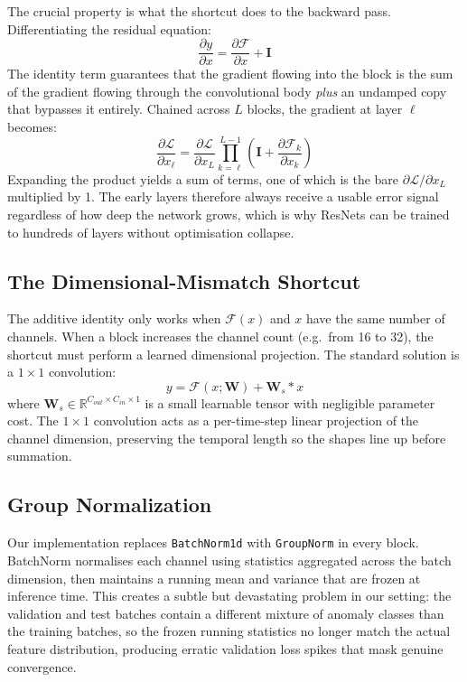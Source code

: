 The crucial property is what the shortcut does to the backward pass. Differentiating the residual equation:
\begin{equation}
    \frac{\partial y}{\partial x} = \frac{\partial \mathcal{F}}{\partial x} + \mathbf{I}
\end{equation}
The identity term guarantees that the gradient flowing into the block is the sum of the gradient flowing through the convolutional body \textit{plus} an undamped copy that bypasses it entirely. Chained across $L$ blocks, the gradient at layer $\ell$ becomes:
\begin{equation}
    \frac{\partial \mathcal{L}}{\partial x_{\ell}} = \frac{\partial \mathcal{L}}{\partial x_{L}} \prod_{k=\ell}^{L-1} \left( \mathbf{I} + \frac{\partial \mathcal{F}_{k}}{\partial x_{k}} \right)
\end{equation}
Expanding the product yields a sum of terms, one of which is the bare $\partial \mathcal{L}/\partial x_{L}$ multiplied by 1. The early layers therefore always receive a usable error signal regardless of how deep the network grows, which is why ResNets can be trained to hundreds of layers without optimisation collapse.

\subsection{The Dimensional-Mismatch Shortcut}
The additive identity only works when $\mathcal{F}(x)$ and $x$ have the same number of channels. When a block increases the channel count (e.g.\ from 16 to 32), the shortcut must perform a learned dimensional projection. The standard solution is a $1 \times 1$ convolution:
\begin{equation}
    y = \mathcal{F}(x; \mathbf{W}) + \mathbf{W}_{s} \ast x
\end{equation}
where $\mathbf{W}_{s} \in \mathbb{R}^{C_{out} \times C_{in} \times 1}$ is a small learnable tensor with negligible parameter cost. The $1 \times 1$ convolution acts as a per-time-step linear projection of the channel dimension, preserving the temporal length so the shapes line up before summation.

\subsection{Group Normalization}
Our implementation replaces \texttt{BatchNorm1d} with \texttt{GroupNorm} in every block. BatchNorm normalises each channel using statistics aggregated across the batch dimension, then maintains a running mean and variance that are frozen at inference time. This creates a subtle but devastating problem in our setting: the validation and test batches contain a different mixture of anomaly classes than the training batches, so the frozen running statistics no longer match the actual feature distribution, producing erratic validation loss spikes that mask genuine convergence.


